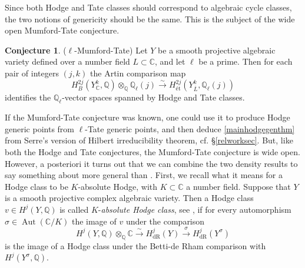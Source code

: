 \documentclass[10pt]{article}
\numberwithin{equation}{section}
\theoremstyle{plain}
\theoremstyle{definition}
\newtheorem{conj}[thm]{Conjecture}
\theoremstyle{remark}
\newcommand{\Q}{\mathbb{Q}}
\begin{document}
Since both Hodge and Tate classes should correspond to algebraic cycle classes, the two notions of genericity should be the same. This is the subject of the wide open Mumford-Tate conjecture.

\begin{conj}($\ell$-Mumford-Tate)
\label{MTconj}
Let $Y$ be a smooth projective algebraic variety defined over a number field $L \subset \mathbb{C}$, and let $\ell$ be a prime. Then for each pair of integers $(j, k)$ the Artin comparison map
\[ H^{2j}_{B}(Y^{k}_{\mathbb{C}}, \mathbb{Q}) \otimes_{\mathbb{Q}} \mathbb{Q}_{\ell}(j) \xrightarrow{\sim} H^{2j}_{\textrm{\'et}}(Y^{k}_{\overline{L}}, \mathbb{Q}_{\ell}(j)) \]
identifies the $\mathbb{Q}_{\ell}$-vector spaces spanned by Hodge and Tate classes.
\end{conj}

\noindent If the Mumford-Tate conjecture was known, one could use it to produce Hodge generic points from $\ell$-Tate generic points, and then deduce \autoref{mainhodgegenthm} from Serre's version of Hilbert irreducibility theorem, cf. \S \ref{relworksec}. But, like both the Hodge and Tate conjectures, the Mumford-Tate conjecture is wide open. However, a posteriori it turns out that we can combine the two density results to say something about  more general than . First, we recall what it means for a Hodge class to be $K$-absolute Hodge, with $K \subset \mathbb{C}$ a number field. Suppose that $Y$ is a smooth projective complex algebraic variety. Then a Hodge class $v \in H^j(Y,\Q)$ is called $K$-\emph{absolute Hodge class}, see \cite{zbMATH03853242}, if for every automorphism $\sigma \in \operatorname{Aut}(\mathbb{C}/K)$ the image of $v$ under the comparison
\[ H^j(Y, \mathbb{Q}) \otimes_{\mathbb{Q}} \mathbb{C} \xrightarrow{\sim} H^j_{\operatorname{dR}}(Y) \xrightarrow{\sigma} H^j_{\operatorname{dR}}(Y^{\sigma}) \]
is the image of a Hodge class under the Betti-de Rham comparison with $H^j(Y^{\sigma}, \mathbb{Q})$. 
\end{document}
